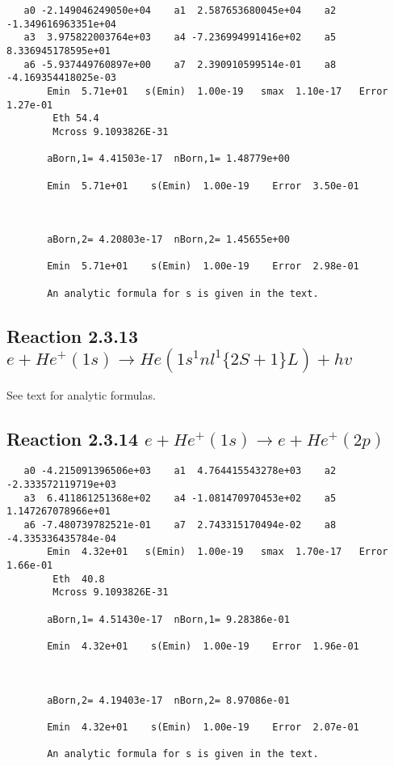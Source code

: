 \documentclass[12pt,dvipdfm]{article}
\begin{document}
\begin{small}\begin{verbatim}
   a0 -2.149046249050e+04    a1  2.587653680045e+04    a2 -1.349616963351e+04
   a3  3.975822003764e+03    a4 -7.236994991416e+02    a5  8.336945178595e+01
   a6 -5.937449760897e+00    a7  2.390910599514e-01    a8 -4.169354418025e-03
       Emin  5.71e+01   s(Emin)  1.00e-19   smax  1.10e-17   Error  1.27e-01
        Eth 54.4
        Mcross 9.1093826E-31

       aBorn,1= 4.41503e-17  nBorn,1= 1.48779e+00

       Emin  5.71e+01    s(Emin)  1.00e-19    Error  3.50e-01



       aBorn,2= 4.20803e-17  nBorn,2= 1.45655e+00

       Emin  5.71e+01    s(Emin)  1.00e-19    Error  2.98e-01

       An analytic formula for s is given in the text.
\end{verbatim}\end{small}

\newpage
\subsection{
Reaction 2.3.13 $  e + He^+(1s) \rightarrow He(1s^1nl^1  \{2S+1\}L) + hv$}

       See text for analytic formulas.



\newpage
\subsection{
Reaction 2.3.14 $   e + He^+(1s) \rightarrow e + He^+(2p)$}





\begin{small}\begin{verbatim}
   a0 -4.215091396506e+03    a1  4.764415543278e+03    a2 -2.333572119719e+03
   a3  6.411861251368e+02    a4 -1.081470970453e+02    a5  1.147267078966e+01
   a6 -7.480739782521e-01    a7  2.743315170494e-02    a8 -4.335336435784e-04
       Emin  4.32e+01   s(Emin)  1.00e-19   smax  1.70e-17   Error  1.66e-01
        Eth  40.8
        Mcross 9.1093826E-31

       aBorn,1= 4.51430e-17  nBorn,1= 9.28386e-01

       Emin  4.32e+01    s(Emin)  1.00e-19    Error  1.96e-01



       aBorn,2= 4.19403e-17  nBorn,2= 8.97086e-01

       Emin  4.32e+01    s(Emin)  1.00e-19    Error  2.07e-01

       An analytic formula for s is given in the text.
\end{verbatim}\end{small}
\end{document}

